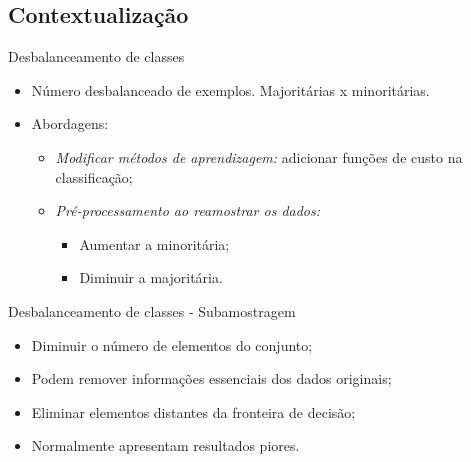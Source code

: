 \documentclass{beamer}
\begin{document}
\subsection{Contextualização}
\begin{frame}{Desbalanceamento de classes}
\setlength\leftmargini{0em}
\justifying
{}
\begin{itemize}
  \item Número desbalanceado de exemplos. Majoritárias x minoritárias.
  \item Abordagens:
    \begin{itemize}
        \item \emph{Modificar métodos de aprendizagem:} adicionar funções de custo na classificação;
        \item \emph{Pré-processamento ao reamostrar os dados:}
      \begin{itemize}
          \item Aumentar a minoritária;
          \item Diminuir a majoritária.
      \end{itemize}
    \end{itemize}
\end{itemize}
\end{frame}
\begin{frame}{Desbalanceamento de classes - Subamostragem}
\setlength\leftmargini{0em}
\justifying
    \begin{itemize}
        \item Diminuir o número de elementos do conjunto;
        \item Podem remover informações essenciais dos dados originais;
        \item Eliminar elementos distantes da fronteira de decisão;
        \item Normalmente apresentam resultados piores.
    \end{itemize}
\end{frame}
\end{document}
